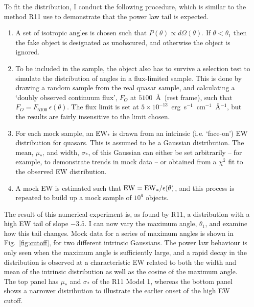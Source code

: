 To fit the distribution, I conduct the following procedure,
which is similar to the method R11 use to demonstrate that the power
law tail is expected.
\begin{enumerate}
	\setlength\itemsep{1em}
	\item A set of isotropic angles is chosen such that 
	$P(\theta)\propto d\Omega(\theta)$. 
	If $\theta<\theta_{1}$ then the fake object is designated as unobscured, 
	and otherwise the object is ignored. 
	\item To be included in the sample, the object also has to 
	survive a selection test
	to simulate the distribution of angles in a flux-limited sample.
	This is done by drawing a random sample from the real quasar sample, 
	and calculating a `doubly observed continuum flux', $F_O$ at $5100$~\AA\ 
	(rest frame), such that $F_O = F_{5100}~\epsilon(\theta)$. The flux limit
	is set at $5\times10^{-13}$~erg~s$^{-1}$~cm$^{-1}$~\AA$^{-1}$, but the results
	are fairly insensitive to the limit chosen.
	\item For each mock sample, an EW$_*$ is drawn from an intrinsic 
	(i.e. `face-on') EW distribution for quasars. This is assumed to be a
	Gaussian distribution. The mean, $\mu_*$, and width, $\sigma_*$, of this Gaussian
	can either be set arbitrarily -- for example, to demonstrate trends
	in mock data -- or obtained from a $\chi^2$ fit to the observed EW
	distribution.
	\item A mock EW is estimated such that ${\rm EW} = {\rm EW}_* / \epsilon(\theta)$,
	and this process is repeated to build up a mock sample of $10^6$ objects.
\end{enumerate}
The result of this numerical experiment is, as found by R11, a distribution
with a high EW tail of slope $-3.5$. I can now vary the maximum angle, $\theta_1$,
and examine how this tail changes. Mock data for a series
of maximum angles is shown in Fig.~\ref{fig:cutoff}, for two different intrinsic 
Gaussians. The power law behaviour is only seen when the maximum angle is
sufficiently large, and a rapid decay in the distribution is observed
at a characteristic EW related to both the width and mean of the
intrinsic distribution as well as the cosine of the maximum angle.
The top panel has $\mu_*$ and $\sigma_*$ of the R11 Model 1, 
whereas the bottom panel shows a narrower distribution to illustrate the 
earlier onset of the high EW cutoff. 

